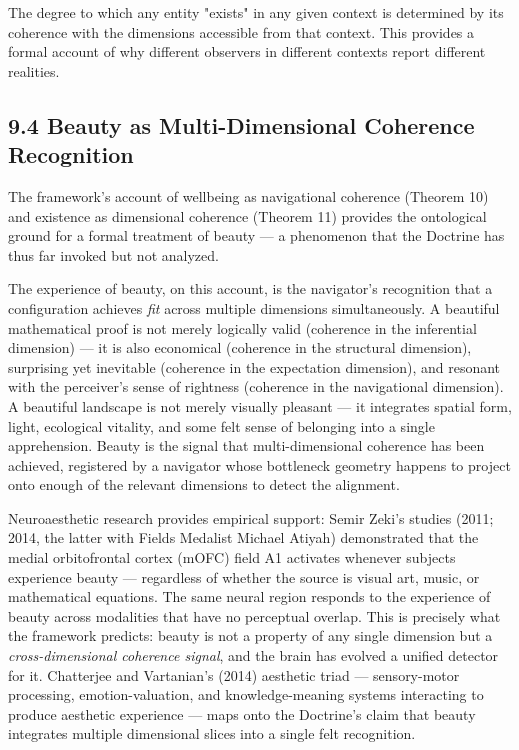 The degree to which any entity "exists" in any given context is determined by its coherence with the dimensions accessible from that context. This provides a formal account of why different observers in different contexts report different realities.


\subsection*{9.4 Beauty as Multi-Dimensional Coherence Recognition}


The framework's account of wellbeing as navigational coherence (Theorem 10) and existence as dimensional coherence (Theorem 11) provides the ontological ground for a formal treatment of beauty — a phenomenon that the Doctrine has thus far invoked but not analyzed.


The experience of beauty, on this account, is the navigator's recognition that a configuration achieves \textit{fit} across multiple dimensions simultaneously. A beautiful mathematical proof is not merely logically valid (coherence in the inferential dimension) — it is also economical (coherence in the structural dimension), surprising yet inevitable (coherence in the expectation dimension), and resonant with the perceiver's sense of rightness (coherence in the navigational dimension). A beautiful landscape is not merely visually pleasant — it integrates spatial form, light, ecological vitality, and some felt sense of belonging into a single apprehension. Beauty is the signal that multi-dimensional coherence has been achieved, registered by a navigator whose bottleneck geometry happens to project onto enough of the relevant dimensions to detect the alignment.


Neuroaesthetic research provides empirical support: Semir Zeki's studies (2011; 2014, the latter with Fields Medalist Michael Atiyah) demonstrated that the medial orbitofrontal cortex (mOFC) field A1 activates whenever subjects experience beauty — regardless of whether the source is visual art, music, or mathematical equations. The same neural region responds to the experience of beauty across modalities that have no perceptual overlap. This is precisely what the framework predicts: beauty is not a property of any single dimension but a \textit{cross-dimensional coherence signal}, and the brain has evolved a unified detector for it. Chatterjee and Vartanian's (2014) aesthetic triad — sensory-motor processing, emotion-valuation, and knowledge-meaning systems interacting to produce aesthetic experience — maps onto the Doctrine's claim that beauty integrates multiple dimensional slices into a single felt recognition.


